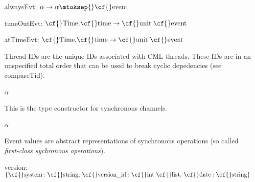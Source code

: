 \begin{interface}
\Nopagebreak
\item {}{} {\cf alwaysEvt: \(\alpha\rightarrow \alpha\mtoksep{}\mbox{\cf{}event}\)}

\Nopagebreak
\item {}{} {\cf timeOutEvt: \(\mbox{\cf{}Time}.\mbox{\cf{}time}\rightarrow \mbox{\cf{}unit}\;\mbox{\cf{}event}\)}

\Nopagebreak
\item {}{} {\cf atTimeEvt: \(\mbox{\cf{}Time}.\mbox{\cf{}time}\rightarrow \mbox{\cf{}unit}\;\mbox{\cf{}event}\)}

\end{interface}

\begin{descr}
\item {}{} \label{ty-CML.thread_id}

\begin{speccomment}
\item 

	  Thread IDs are the unique IDs associated with CML threads. 	  These IDs are in an unspecified total order that can be used to 	  break cyclic depedencies (see {\cf \small compare\-Tid}).     \end{speccomment}
\item {}{} \(\alpha\)~\label{ty-CML.chan}

\begin{speccomment}
\item 

          This is the type constructor for synchronous channels.     \end{speccomment}
\item {}{} \(\alpha\)~\label{ty-CML.event}

\begin{speccomment}
\item 

	  Event values are abstract representations of synchronous operations 	  (so called \emph{first-class sychronous operations}).     \end{speccomment}
\item {}{} {\cf version: \(\{\mbox{\cf{}system}:\mbox{\cf{}string},\,\mbox{\cf{}version\_id}:\mbox{\cf{}int}\;\mbox{\cf{}list},\,\mbox{\cf{}date}:\mbox{\cf{}string}\}\)}\label{val-CML.version}


\end{descr}

